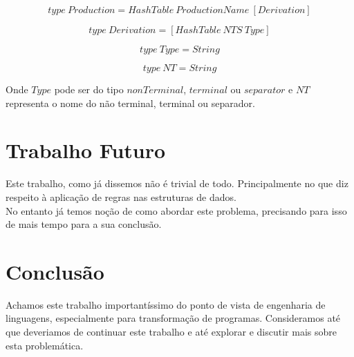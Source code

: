 \documentclass[11pt,a4paper]{article}
\begin{document}
$$type~Production = HashTable~ProductionName~[Derivation]$$

$$type~Derivation = [HashTable~NTS~Type]$$

$$type~Type = String$$

$$type~NT = String$$

Onde $Type$ pode ser do tipo $nonTerminal$, $terminal$ ou $separator$ e $NT$ representa o nome do não terminal, terminal ou separador.

\section{Trabalho Futuro}
Este trabalho, como já dissemos não é trivial de todo. Principalmente no que diz respeito à aplicação de regras nas estruturas de dados.\\
No entanto já temos noção de como abordar este problema, precisando para isso de mais tempo para a sua conclusão.

\section{Conclusão}
Achamos este trabalho importantíssimo do ponto de vista de engenharia de linguagens, especialmente para transformação de programas. Consideramos até que deveriamos de continuar
este trabalho e até explorar e discutir mais sobre esta problemática.
\end{document}
